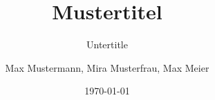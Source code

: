 \author{
	Max Mustermann,
	Mira Musterfrau,
	Max Meier
}
\titlehead{Fachbereich}
\subject{Grund der Arbeit}
\title{Mustertitel}
\subtitle{Untertitle}
\date{\today}

